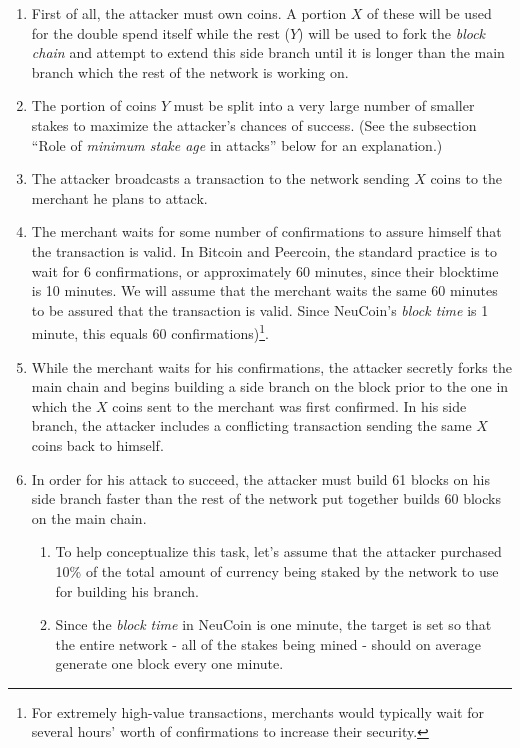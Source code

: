 \documentclass[a4paper,11pt]{article}
\begin{document}
\begin{enumerate}
\setlength{\itemsep}{0pt}
\item{First of all, the attacker must own coins. A portion $X$ of these will be used for the double spend itself while the rest ($Y$) will be used to fork the \textit{block chain} and attempt to extend this side branch until it is longer than the main branch which the rest of the network is working on. }
\item{The portion of coins $Y$ must be split into a very large number of smaller stakes to maximize the attacker's chances of success. (See the subsection ``Role of \textit{minimum stake age} in attacks'' below for an explanation.)}
\item{The attacker broadcasts a transaction to the network sending $X$ coins to the merchant he plans to attack.}
\item{The merchant waits for some number of confirmations to assure himself that the transaction is valid. In Bitcoin and Peercoin, the standard practice is to wait for 6 confirmations, or approximately 60 minutes, since their blocktime is 10 minutes. We will assume that the merchant waits the same 60 minutes to be assured that the transaction is valid. Since NeuCoin's \textit{block time} is 1 minute, this equals 60 confirmations)\footnote{ For extremely high-value transactions, merchants would typically wait for several hours' worth of confirmations to increase their security.}.}
\item{While the merchant waits for his confirmations, the attacker secretly forks the main chain and begins building a side branch on the block prior to the one in which the $X$ coins sent to the merchant was first confirmed. In his side branch, the attacker includes a conflicting transaction sending the same $X$ coins back to himself.}
\item{In order for his attack to succeed, the attacker must build 61 blocks on his side branch faster than the rest of the network put together builds 60 blocks on the main chain. 
	\begin{enumerate}
	\setlength{\itemsep}{0pt}
	\item{To help conceptualize this task, let's assume that the attacker purchased 10\% of the total amount of currency being staked by the network to use for building his branch.}
	\item{Since the \textit{block time} in NeuCoin is one minute, the target is set so that the entire network - all of the stakes being mined - should on average generate one block every one minute.}

\end{enumerate}}
\end{enumerate}
\end{document}
